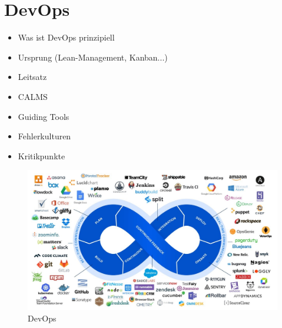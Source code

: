 \chapter{\ac{DevOps}}

\begin{itemize}
\item Was ist \ac{DevOps} prinzipiell
\item Ursprung (Lean-Management, Kanban...)
\item Leitsatz
\item CALMS
\item Guiding Tools
\item Fehlerkulturen
\item Kritikpunkte
\end{itemize}

\begin{figure}[h]
\centering
\includegraphics[width=\textwidth]{Graphics/devops}
\caption{\ac{DevOps} \cite{uplink:2021}}
\end{figure}
